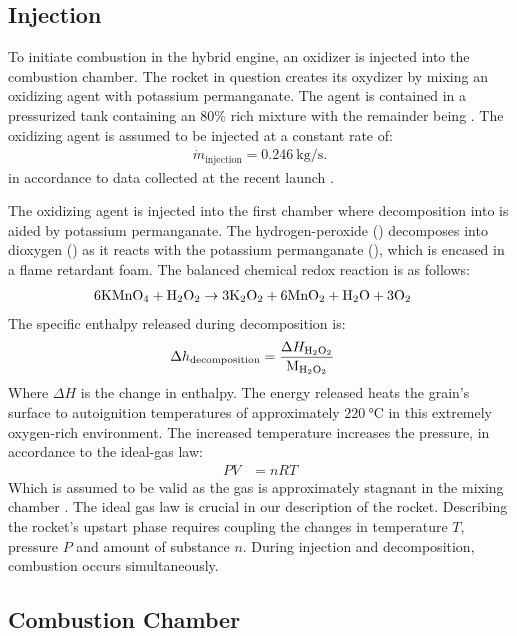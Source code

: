 \subsection{Injection}

	To initiate combustion in the hybrid engine, an oxidizer is injected into the combustion chamber. The rocket in question creates its oxydizer by mixing an oxidizing agent with potassium permanganate. The agent is contained in a pressurized tank containing an $80 \%$  rich mixture with the remainder being . The oxidizing agent is assumed to be injected at a constant rate of:
		\begin{align}
			\dot{m}_\text{injection} = \SI{0.246}{\kg\per\s}.
		\end{align}
	in accordance to data collected at the recent launch \cite{Alex2015rapport}.

	The oxidizing agent is injected into the first chamber where decomposition into  is aided by potassium permanganate. The hydrogen-peroxide () decomposes into dioxygen () as it reacts with the potassium permanganate (), which is encased in a flame retardant foam. The balanced chemical redox reaction is as follows:
		\begin{align}
			\mathrm{6 KMnO_4 + H_2O_2} &\rightarrow \mathrm{3 K_2O_2 + 6 MnO_2 + H_2O + 3 O_2}
		\end{align}
	The specific enthalpy released during decomposition is:
		\begin{align}
			\Delta h_\text{decomposition} &= \frac{\Delta H_{\mathrm{H_2O_2}}}{\text{M}_{\mathrm{H_2O_2}}}
		\end{align}
	Where $\Delta H$ is the change in enthalpy. The energy released heats the grain's surface to autoignition temperatures of approximately $\SI{220}{\celsius}$ in this extremely oxygen-rich environment. The increased temperature increases the pressure, in accordance to the ideal-gas law:
		\begin{align}
			P V &= n R T
		\end{align}
	Which is assumed to be valid as the gas is approximately stagnant in the mixing chamber \cite{atkins}.
	The ideal gas law is crucial in our description of the rocket. Describing the rocket's upstart phase requires coupling the changes in temperature $T$, pressure $P$ and amount of substance $n$. During injection and decomposition, combustion occurs simultaneously.

	\subsection{Combustion Chamber}

